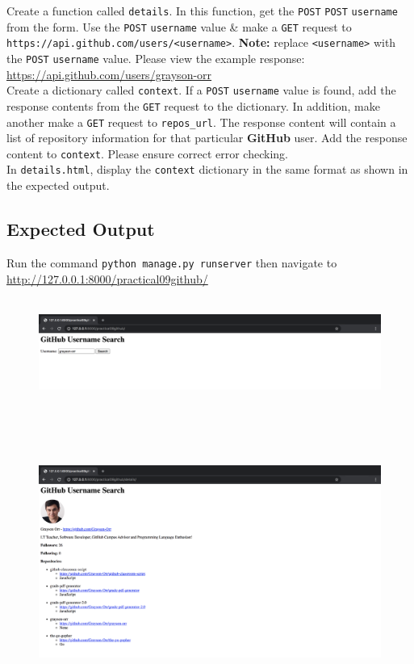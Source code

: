 \documentclass{article}
\begin{document}
Create a function called \texttt{details}. In this function, get the \texttt{POST} \texttt{POST} \texttt{username} from the form. Use the \texttt{POST} \texttt{username} value \& make a \texttt{GET} request to \texttt{https://api.github.com/users/<username>}. \textbf{Note:} replace \texttt{<username>} with the \texttt{POST} \texttt{username} value. Please view the example response: \href{https://api.github.com/users/grayson-orr}{https://api.github.com/users/grayson-orr} \\

Create a dictionary called \texttt{context}. If a \texttt{POST} \texttt{username} value is found, add the response contents from the \texttt{GET} request to the dictionary. In addition, make another make a \texttt{GET} request to \texttt{repos\_url}. The response content will contain a list of repository information for that particular \textbf{GitHub} user. Add the response content to \texttt{context}. Please ensure correct error checking. \\

In \texttt{details.html}, display the \texttt{context} dictionary in the same format as shown in the expected output.\\

\subsection*{Expected Output} 
Run the command \texttt{python manage.py runserver} then navigate to \href{http://127.0.0.1:8000/practical09github/}{http://127.0.0.1:8000/practical09github/} \\

\begin{figure}[H]
  \includegraphics[width=175mm, height=35mm]{./img/09-expected-github-2.png}
  \includegraphics[width=175mm, height=100mm]{./img/09-expected-github-3.png}
\end{figure}
\end{document}

